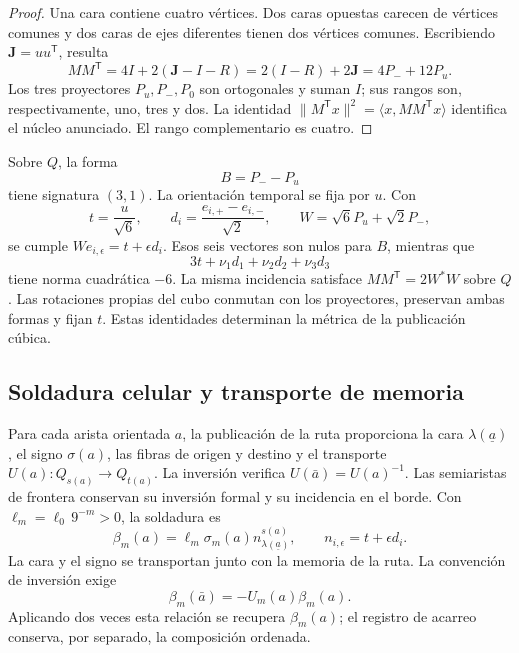 \begin{proof}
Una cara contiene cuatro vértices. Dos caras opuestas carecen de vértices
comunes y dos caras de ejes diferentes tienen dos vértices comunes.
Escribiendo \(\mathbf J=uu^{\mathsf T}\), resulta
\[
 MM^{\mathsf T}=4I+2(\mathbf J-I-R)
 =2(I-R)+2\mathbf J=4P_-+12P_u.
\]
Los tres proyectores \(P_u,P_-,P_0\) son ortogonales y suman \(I\);
sus rangos son, respectivamente, uno, tres y dos. La identidad
\(\|M^{\mathsf T}x\|^2=\langle x,MM^{\mathsf T}x\rangle\)
identifica el núcleo anunciado. El rango complementario es cuatro.
\end{proof}

Sobre \(Q\), la forma
\[
 B=P_--P_u
\]
tiene signatura \((3,1)\). La orientación temporal se fija por \(u\).
Con
\[
 t=\frac{u}{\sqrt6},\qquad
 d_i=\frac{e_{i,+}-e_{i,-}}{\sqrt2},\qquad
 W=\sqrt6P_u+\sqrt2P_-,
\]
se cumple \(We_{i,\epsilon}=t+\epsilon d_i\). Esos seis vectores
son nulos para \(B\), mientras que
\[
 3t+\nu_1d_1+\nu_2d_2+\nu_3d_3
\]
tiene norma cuadrática \(-6\). La misma incidencia satisface
\(MM^{\mathsf T}=2W^*W\) sobre \(Q\). Las rotaciones propias del cubo
conmutan con los proyectores, preservan ambas formas y fijan \(t\).
Estas identidades determinan la métrica de la publicación cúbica.

\subsection{Soldadura celular y transporte de memoria}
\label{vii:vii:sec:soldadura-celular}

Para cada arista orientada \(a\), la publicación de la ruta proporciona
la cara \(\lambda(\underline a)\), el signo
\(\sigma(a)\), las fibras de origen y destino y el transporte
\(U(a):Q_{s(a)}\longrightarrow Q_{t(a)}\).
La inversión verifica \(U(\bar a)=U(a)^{-1}\).
Las semiaristas de frontera conservan su inversión formal y su incidencia
en el borde. Con \(\ell_m=\ell_0\,9^{-m}>0\), la soldadura es
\begin{equation}
 \beta_m(a)=\ell_m\sigma_m(a)
              n_{\lambda(\underline a)}^{s(a)},\qquad
 n_{i,\epsilon}=t+\epsilon d_i.
 \label{vii:vii:eq:soldadura-arista}
\end{equation}
La cara y el signo se transportan junto con la memoria de la ruta.
La convención de inversión exige
\begin{equation}
 \beta_m(\bar a)=-U_m(a)\beta_m(a).
 \label{vii:vii:eq:inversion-soldadura}
\end{equation}
Aplicando dos veces esta relación se recupera \(\beta_m(a)\);
el registro de acarreo conserva, por separado, la composición ordenada.


